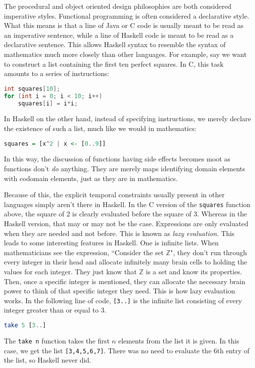 \documentclass[MS, xcolor=dvipsnames]{wfuthesis}
\def\bZ{\mathbb{Z}}
\theoremstyle{definition}
\begin{document}
The procedural and object oriented design philosophies are both considered imperative styles. Functional programming is often considered a declarative style. What this means is that a line of Java or C code is usually meant to be read as an imperative sentence, while a line of Haskell code is meant to be read as a declarative sentence. This allows Haskell syntax to resemble the syntax of mathematics much more closely than other languages. For example, say we want to construct a list containing the first ten perfect squares. In C, this task amounts to a series of instructions:
\begin{lstlisting}[language=C]
int squares[10];
for (int i = 0; i < 10; i++)
    squares[i] = i*i;
\end{lstlisting}
In Haskell on the other hand, instead of specifying instructions, we merely declare the existence of such a list, much like we would in mathematics:
\begin{lstlisting}[language=Haskell]
squares = [x^2 | x <- [0..9]]
\end{lstlisting}
In this way, the discussion of functions having side effects becomes moot as functions don't \emph{do} anything. They are merely maps identifying domain elements with codomain elements, just as they are in mathematics. \par
Because of this, the explicit temporal constraints usually present in other languages simply aren't there in Haskell. In the C version of the \lstinline{squares} function above, the square of 2 is clearly evaluated before the square of 3. Whereas in the Haskell version, that may or may not be the case. Expressions are only evaluated when they are needed and not before. This is known as \emph{lazy evaluation}. This leads to some interesting features in Haskell. One is infinite lists. When mathematicians see the expression, ``Consider the set $\bZ$", they don't run through every integer in their head and allocate infinitely many brain cells to holding the values for each integer. They just know that $\bZ$ is a set and know its properties. Then, once a specific integer is mentioned, they can allocate the necessary brain power to think of that specific integer they need. This is how lazy evaluation works. In the following line of code, \lstinline{[3..]} is the infinite list consisting of every integer greater than or equal to 3.
\begin{lstlisting}[language=Haskell]
take 5 [3..]
\end{lstlisting}
The \lstinline{take n} function takes the first $n$ elements from the list it is given. In this case, we get the list \lstinline{[3,4,5,6,7]}. There was no need to evaluate the 6th entry of the list, so Haskell never did. \par
\end{document}
